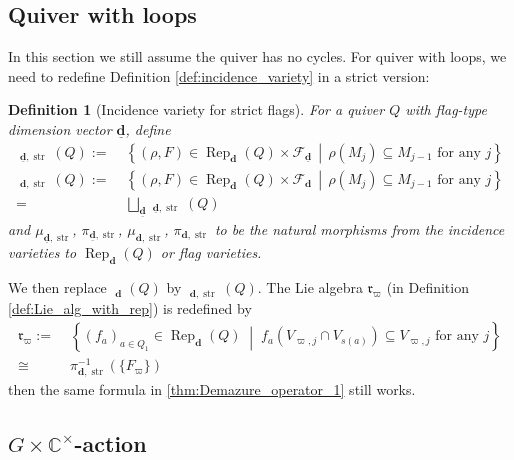 \documentclass[reqno,11pt]{book}
\numberwithin{equation}{section}
\theoremstyle{plain}
\newtheorem{defn}[theorem]{Definition}
\theoremstyle{plain}
\numberwithin{equation}{section}
\theoremstyle{remark}
\DeclareMathOperator{\Rep}{\operatorname{Rep}}
\DeclareMathOperator{\RRep}{\widetilde{\operatorname{Rep}}}
\DeclareMathOperator{\str}{\operatorname{str}}
\newcommand{\dimvec}[1]{\mathbf{#1}}
\newcommand{\ftdimvec}[1]{\underline{\dimvec{#1}}}
\newcommand{\ww}{\varpi}
\begin{document}
\subsection{Quiver with loops}
In this section we still assume the quiver has no cycles. For quiver with loops, we need to redefine Definition \ref{def:incidence_variety} in a strict version:
\begin{defn}[Incidence variety for strict flags]\label{def:incidence_variety_str}
For a quiver $Q$ with flag-type dimension vector $\ftdimvec{d}$, define
\begin{equation*}
\begin{aligned}
  \RRep_{\ftdimvec{d},\str}(Q):=\;& \left\{ (\rho,F) \in \Rep_{\dimvec{d}}(Q) \times \mathcal{F}_{\ftdimvec{d}}  \,\middle|\, \rho(M_j) \subseteq M_{j-1} \text{ for any } j \right\} \\
  \RRep_{\dimvec{d},\str}(Q):=\;& \left\{ (\rho,F) \in \Rep_{\dimvec{d}}(Q) \times \mathcal{F}_{\dimvec{d}}  \,\middle|\, \rho(M_j) \subseteq M_{j-1} \text{ for any } j \right\} \\
  =\;& \bigsqcup_{\ftdimvec{d}} \RRep_{\ftdimvec{d},\str}(Q)
\end{aligned}
\end{equation*}
and $\mu_{\ftdimvec{d},\str}$, $\pi_{\ftdimvec{d},\str}$, $\mu_{\dimvec{d},\str}$, $\pi_{\dimvec{d},\str}$ to be the natural morphisms from the incidence varieties to $\Rep_{\dimvec{d}}(Q)$ or flag varieties.
\end{defn}
We then replace $\RRep_{\dimvec{d}}(Q)$ by $\RRep_{\dimvec{d},\str}(Q)$. The Lie algebra $\mathfrak{r}_{\ww}$ (in Definition \ref{def:Lie_alg_with_rep}) is redefined by
\begin{equation*}
\begin{aligned}
  \mathfrak{r}_{\ww}:=\;& \left\{ (f_a)_{a\in Q_1} \in \Rep_{\dimvec{d}}(Q) \;\middle| \;  f_a(V_{\ww,j} \cap V_{s(a)}) \subseteq V_{\ww,j} \text{ for any } j \right\}\\
  \cong\;& \pi_{\dimvec{d},\str}^{-1}(\{F_{\ww} \})
\end{aligned}
\end{equation*}
then the same formula in \ref{thm:Demazure_operator_1} still works.
\subsection{$G \times \mathbb{C}^{\times}$-action}\label{subsec:Cstar_action}
\end{document}
